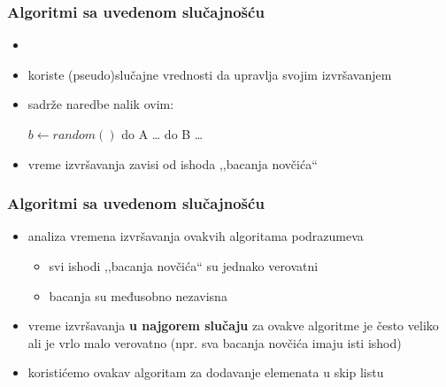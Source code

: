 \documentclass[compress,aspectratio=169]{beamer}
\begin{document}
\begin{frame}[fragile]
  \frametitle{Algoritmi sa uvedenom slučajnošću}
  \begin{itemize}
    \item {}
    \item koriste (pseudo)slučajne vrednosti da upravlja svojim izvršavanjem
    \item sadrže naredbe nalik ovim:
    \begin{algorithmic}
      \STATE $b \leftarrow random()$
        \STATE do A \ldots
      \ELSE
        \STATE do B \ldots
      \ENDIF
    \end{algorithmic}
    \item vreme izvršavanja zavisi od ishoda ,,bacanja novčića``
  \end{itemize}
\end{frame}

\begin{frame}[fragile]
  \frametitle{Algoritmi sa uvedenom slučajnošću}
  \begin{itemize}
    \item analiza vremena izvršavanja ovakvih algoritama podrazumeva 
    \begin{itemize}
      \item svi ishodi ,,bacanja novčića`` su jednako verovatni
      \item bacanja su međusobno nezavisna
    \end{itemize}
    \item vreme izvršavanja \textbf{u najgorem slučaju} za ovakve algoritme je često veliko ali je vrlo malo verovatno (npr. sva bacanja novčića imaju isti ishod)
    \item koristićemo ovakav algoritam za dodavanje elemenata u skip listu
  \end{itemize}
\end{frame}
\end{document}

